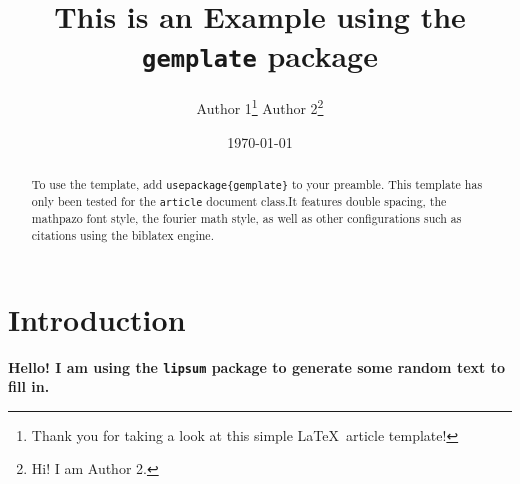 \documentclass[12pt]{article}
\title{This is an Example using the \texttt{gemplate} package}
\author{Author 1\thanks{\protect\linespread{1}\protect\selectfont Thank you for taking a look at this simple \LaTeX \ article template!} \hspace{15ex}
Author 2\thanks{\protect\linespread{1}\protect\selectfont Hi! I am Author 2.}}
\date{\today}
\begin{document}
\maketitle

\begin{abstract}
    To use the template, add \texttt{usepackage\{gemplate\}} to your preamble. This template has only been tested for the \texttt{article} document class.It features double spacing, the mathpazo font style, the fourier math style, as well as other configurations such as citations using the biblatex engine.
\end{abstract}

\newpage

\section{Introduction}
\textbf{Hello! I am using the \texttt{lipsum} package to generate some random text to fill in.} ~\\

\lipsum[2-3]









\newpage
\printbibliography
\end{document}
